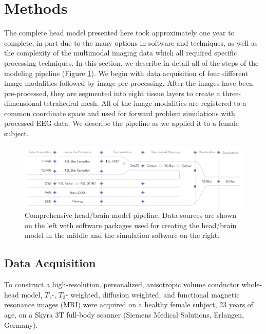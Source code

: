 
\section{Methods}
\label{sec:Methods}

The complete head model presented here took approximately one year to complete, in part due to the many options in software and techniques, as well as the complexity of the multimodal imaging data which all required specific processing techniques. In this section, we describe in detail all of the steps of the modeling pipeline (Figure \ref{fig:pipeline}). We begin with data acquisition of four different image modalities followed by image pre-processing. After the images have been pre-processed, they are segmented into eight tissue layers to create a three-dimensional tetrahedral mesh. All of the image modalities are registered to a common coordinate space and used for forward problem simulations with processed EEG data. We describe the pipeline as we applied it to a female subject. 

\begin{figure}[H]
    \centering
    \includegraphics[width=\textwidth]{Figures/pipeline}
    \caption{Comprehensive head/brain model pipeline. Data sources are shown on the left with software packages used for creating the head/brain model in the middle and the simulation software on the right.}
    \label{fig:pipeline}
\end{figure}

\subsection{Data Acquisition}
\label{sec:Data}


To construct a high-resolution, personalized, anisotropic volume conductor whole-head model, $T_1$-, $T_2$- weighted, diffusion weighted, and functional magnetic resonance images (MRI) were acquired on a healthy female subject, 23 years of age, on a Skyra 3T full-body scanner (Siemens Medical Solutions, Erlangen, Germany).

